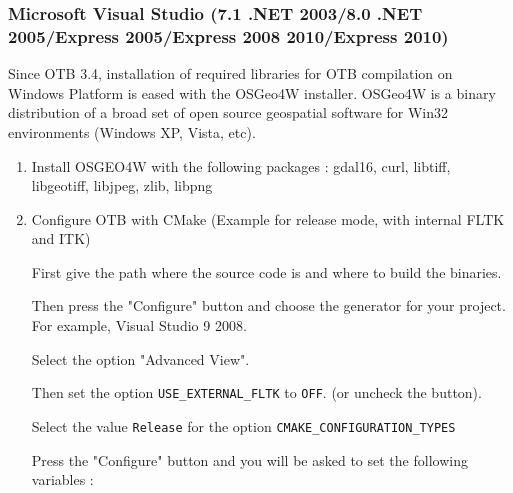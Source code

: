 \subsubsection{Microsoft Visual Studio (7.1 .NET 2003/8.0 .NET 2005/Express 2005/Express 2008 2010/Express 2010)}
Since OTB 3.4, installation of required libraries for OTB compilation on Windows Platform is eased with the  
OSGeo4W installer. OSGeo4W is a binary distribution of a broad set of open source geospatial software 
for Win32 environments (Windows XP, Vista, etc).
\begin{enumerate}

\item Install OSGEO4W with the following packages : gdal16, curl, libtiff, libgeotiff, libjpeg, zlib, libpng

\item Configure OTB with CMake (Example for release mode, with internal FLTK and ITK)

    First give the path where the source code is and where to build the binaries.

    Then press the "Configure" button and choose the generator for your project. For example, Visual Studio 9 2008.

    Select the option "Advanced View".

    Then set the option \texttt{USE\_EXTERNAL\_FLTK} to \texttt{OFF}. (or uncheck the button).

    Select the value \texttt{Release} for the option \texttt{CMAKE\_CONFIGURATION\_TYPES}

    Press the "Configure" button and you will be asked to set the following variables :


\end{enumerate}
